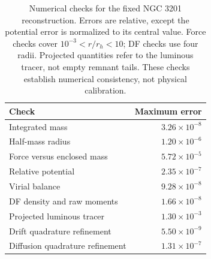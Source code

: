\begin{table}[t]
\caption{Numerical checks for the fixed NGC 3201 reconstruction. Errors are relative, except the potential error is normalized to its central value. Force checks cover $10^{-3}<r/r_h<10$; DF checks use four radii. Projected quantities refer to the luminous tracer, not empty remnant tails. These checks establish numerical consistency, not physical calibration.}\label{tab:host-validation}
\centering\begin{tabular}{lr}
\toprule
Check & Maximum error \\
\midrule
Integrated mass & $3.26\times10^{-8}$ \\
Half-mass radius & $1.20\times10^{-6}$ \\
Force versus enclosed mass & $5.72\times10^{-5}$ \\
Relative potential & $2.35\times10^{-7}$ \\
Virial balance & $9.28\times10^{-8}$ \\
DF density and raw moments & $1.66\times10^{-8}$ \\
Projected luminous tracer & $1.30\times10^{-3}$ \\
Drift quadrature refinement & $5.50\times10^{-9}$ \\
Diffusion quadrature refinement & $1.31\times10^{-7}$ \\
\bottomrule
\end{tabular}
\end{table}
